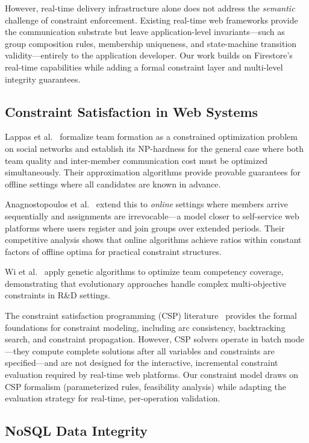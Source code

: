 \documentclass[11pt,a4paper]{article}
\theoremstyle{plain}
\theoremstyle{definition}
\begin{document}
However, real-time delivery infrastructure alone does not address the \emph{semantic} challenge of constraint enforcement. Existing real-time web frameworks provide the communication substrate but leave application-level invariants---such as group composition rules, membership uniqueness, and state-machine transition validity---entirely to the application developer. Our work builds on Firestore's real-time capabilities while adding a formal constraint layer and multi-level integrity guarantees.

\subsection{Constraint Satisfaction in Web Systems}

Lappas et al.~\cite{lappas2009} formalize team formation as a constrained optimization problem on social networks and establish its NP-hardness for the general case where both team quality and inter-member communication cost must be optimized simultaneously. Their approximation algorithms provide provable guarantees for offline settings where all candidates are known in advance.

Anagnostopoulos et al.~\cite{anagnostopoulos2012} extend this to \emph{online} settings where members arrive sequentially and assignments are irrevocable---a model closer to self-service web platforms where users register and join groups over extended periods. Their competitive analysis shows that online algorithms achieve ratios within constant factors of offline optima for practical constraint structures.

Wi et al.~\cite{wi2009} apply genetic algorithms to optimize team competency coverage, demonstrating that evolutionary approaches handle complex multi-objective constraints in R\&D settings.

The constraint satisfaction programming (CSP) literature~\cite{rossi2006, kumar1992, tsang1999} provides the formal foundations for constraint modeling, including arc consistency, backtracking search, and constraint propagation. However, CSP solvers operate in batch mode---they compute complete solutions after all variables and constraints are specified---and are not designed for the interactive, incremental constraint evaluation required by real-time web platforms. Our constraint model draws on CSP formalism (parameterized rules, feasibility analysis) while adapting the evaluation strategy for real-time, per-operation validation.

\subsection{NoSQL Data Integrity}
\end{document}
